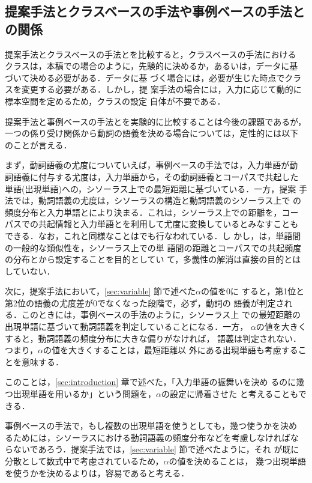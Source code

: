 \subsection{提案手法とクラスベースの手法や事例ベースの手法との関係}

提案手法とクラスベースの手法とを比較すると，クラスベースの手法における
クラスは，本稿での場合のように，先験的に決めるか，あるいは，データに基
づいて決める\cite{Resnik92,Nomiyama93,Tanaka95a}必要がある．データに基
づく場合には，必要が生じた時点でクラスを変更する必要がある．しかし，提
案手法の場合には，入力に応じて動的に標本空間を定めるため，クラスの設定
自体が不要である．

提案手法と事例ベースの手法とを実験的に比較することは今後の課題であるが，
一つの係り受け関係から動詞の語義を決める場合については，定性的には以下
のことが言える．

まず，動詞語義の尤度についていえば，事例ベースの手法では，入力単語が動
詞語義に付与する尤度は，入力単語から，その動詞語義とコーパスで共起した
単語(出現単語)への，シソーラス上での最短距離に基づいている．一方，提案
手法では，動詞語義の尤度は，シソーラスの構造と動詞語義のシソーラス上で
の頻度分布と入力単語とにより決まる．これは，シソーラス上での距離を，コー
パスでの共起情報と入力単語とを利用して尤度に変換しているとみなすことも
できる．なお，これと同様なことは\cite{Shinnou96}でも行なわれている．し
かし，\cite{Shinnou96}は，単語間の一般的な類似性を，シソーラス上での単
語間の距離とコーパスでの共起頻度の分布とから設定することを目的としてい
て，多義性の解消は直接の目的とはしていない．

次に，提案手法において，\ref{sec:variable} 節で述べた$\alpha$の値を0に
すると，第1位と第2位の語義の尤度差が0でなくなった段階で，必ず，動詞の
語義が判定される．このときには，事例ベースの手法のように，シソーラス上
での最短距離の出現単語に基づいて動詞語義を判定していることになる．一方，
$\alpha$の値を大きくすると，動詞語義の頻度分布に大きな偏りがなければ，
語義は判定されない．つまり，$\alpha$の値を大きくすることは，最短距離以
外にある出現単語も考慮することを意味する．

このことは，\ref{sec:introduction} 章で述べた，「入力単語の振舞いを決め
るのに幾つ出現単語を用いるか」という問題を，$\alpha$の設定に帰着させた
と考えることもできる．

事例ベースの手法で，もし複数の出現単語を使うとしても，幾つ使うかを決め
るためには，シソーラスにおける動詞語義の頻度分布などを考慮しなければな
らないであろう．提案手法では，\ref{sec:variable} 節で述べたように，それ
が既に分散として数式中で考慮されているため，$\alpha$の値を決めることは，
幾つ出現単語を使うかを決めるよりは，容易であると考える．


